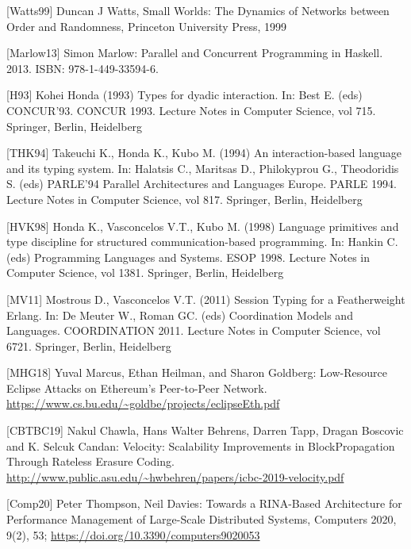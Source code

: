 \documentclass[]{article}
\begin{document}
{[}Watts99{]} Duncan J Watts, Small Worlds: The Dynamics of Networks
between Order and Randomness, Princeton University Press, 1999

{[}Marlow13{]} Simon Marlow: Parallel and Concurrent Programming in
Haskell. 2013. ISBN: 978-1-449-33594-6.

{[}H93{]} Kohei Honda (1993) Types for dyadic interaction. In: Best E.
(eds) CONCUR'93. CONCUR 1993. Lecture Notes in Computer Science, vol
715. Springer, Berlin, Heidelberg

{[}THK94{]} Takeuchi K., Honda K., Kubo M. (1994) An interaction-based
language and its typing system. In: Halatsis C., Maritsas D.,
Philokyprou G., Theodoridis S. (eds) PARLE'94 Parallel Architectures and
Languages Europe. PARLE 1994. Lecture Notes in Computer Science, vol
817. Springer, Berlin, Heidelberg

{[}HVK98{]} Honda K., Vasconcelos V.T., Kubo M. (1998) Language
primitives and type discipline for structured communication-based
programming. In: Hankin C. (eds) Programming Languages and Systems. ESOP
1998. Lecture Notes in Computer Science, vol 1381. Springer, Berlin,
Heidelberg

{[}MV11{]} Mostrous D., Vasconcelos V.T. (2011) Session Typing for a
Featherweight Erlang. In: De Meuter W., Roman GC. (eds) Coordination
Models and Languages. COORDINATION 2011. Lecture Notes in Computer
Science, vol 6721. Springer, Berlin, Heidelberg

{[}MHG18{]} Yuval Marcus, Ethan Heilman, and Sharon Goldberg:
Low-Resource Eclipse Attacks on Ethereum's Peer-to-Peer Network.
\href{https://www.cs.bu.edu/~goldbe/projects/eclipseEth.pdf}{{https://www.cs.bu.edu/\textasciitilde{}goldbe/projects/eclipseEth.pdf}}

{[}CBTBC19{]} Nakul Chawla, Hans Walter Behrens, Darren Tapp, Dragan
Boscovic and K. Selcuk Candan: Velocity: Scalability Improvements in
BlockPropagation Through Rateless Erasure Coding.
\href{http://www.public.asu.edu/~hwbehren/papers/icbc-2019-velocity.pdf}{{http://www.public.asu.edu/\textasciitilde{}hwbehren/papers/icbc-2019-velocity.pdf}}

{[}Comp20{]} Peter Thompson, Neil Davies: Towards a RINA-Based
Architecture for Performance Management of Large-Scale Distributed
Systems, Computers 2020, 9(2), 53;
\href{https://doi.org/10.3390/computers9020053}{{https://doi.org/10.3390/computers9020053}}
\end{document}
